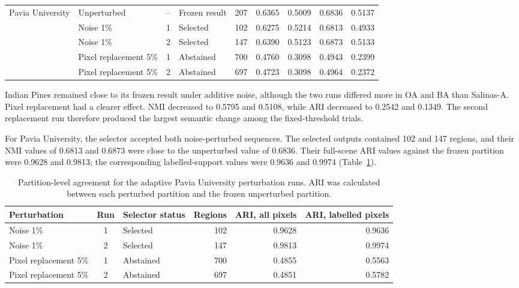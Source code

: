\documentclass[10pt,a4paper,fleqn]{article}
\begin{document}
\begin{table}[!t]
\begin{tabular}{@{}llclrrrrr@{}}
\multirow{5}{*}{Pavia University}
& Unperturbed & -- & Frozen result & 207
& 0.6365 & 0.5009 & 0.6836 & 0.5137 \\
& Noise 1\% & 1 & Selected & 102
& 0.6275 & 0.5214 & 0.6813 & 0.4933 \\
& Noise 1\% & 2 & Selected & 147
& 0.6390 & 0.5123 & 0.6873 & 0.5133 \\
& Pixel replacement 5\% & 1 & Abstained & 700
& 0.4760 & 0.3098 & 0.4943 & 0.2399 \\
& Pixel replacement 5\% & 2 & Abstained & 697
& 0.4723 & 0.3098 & 0.4964 & 0.2372 \\
\bottomrule
\end{tabular}
\end{table}

Indian Pines remained close to its frozen result under additive noise, although
the two runs differed more in OA and BA than Salinas-A. Pixel replacement had
a clearer effect. NMI decreased to 0.5795 and 0.5108, while ARI decreased to
0.2542 and 0.1349. The second replacement run therefore produced the largest
semantic change among the fixed-threshold trials.

For Pavia University, the selector accepted both noise-perturbed sequences.
The selected outputs contained 102 and 147 regions, and their NMI values of
0.6813 and 0.6873 were close to the unperturbed value of 0.6836. Their
full-scene ARI values against the frozen partition were 0.9628 and 0.9813;
the corresponding labelled-support values were 0.9636 and 0.9974
(Table~\ref{tab:pavia_partition_agreement}).

\begin{table}[!t]
\centering
\footnotesize
\caption{Partition-level agreement for the adaptive Pavia University
perturbation runs. ARI was calculated between each perturbed partition and the
frozen unperturbed partition.}
\label{tab:pavia_partition_agreement}

\renewcommand{\arraystretch}{1.05}
\setlength{\tabcolsep}{5pt}

\begin{tabular}{@{}lclrrr@{}}
\toprule
Perturbation &
Run &
Selector status &
Regions &
ARI, all pixels &
ARI, labelled pixels \\
\midrule
Noise 1\% & 1 & Selected & 102 & 0.9628 & 0.9636 \\
Noise 1\% & 2 & Selected & 147 & 0.9813 & 0.9974 \\
Pixel replacement 5\% & 1 & Abstained & 700 & 0.4855 & 0.5563 \\
Pixel replacement 5\% & 2 & Abstained & 697 & 0.4851 & 0.5782 \\
\bottomrule
\end{tabular}
\end{table}
\end{document}
